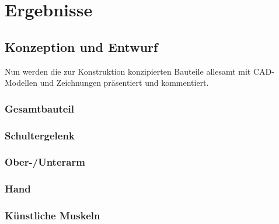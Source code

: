 \chapter{Ergebnisse}
	\section{Konzeption und Entwurf}
		Nun werden die zur Konstruktion konzipierten Bauteile allesamt mit CAD-Modellen und Zeichnungen präsentiert und kommentiert.
		\subsection{Gesamtbauteil}
		\subsection{Schultergelenk}
		\subsection{Ober-/Unterarm}
		\subsection{Hand}
		\subsection{Künstliche Muskeln}